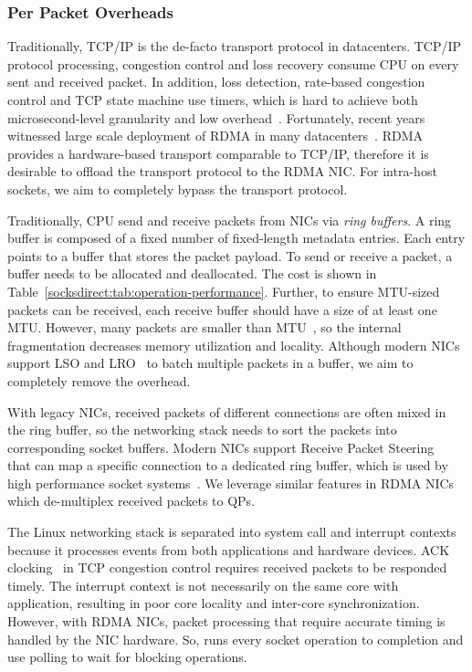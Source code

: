 \subsubsection{Per Packet Overheads}
\label{socksdirect:subsec:per-packet-overhead}
\quad

Traditionally, TCP/IP is the de-facto transport protocol in datacenters.
TCP/IP protocol processing, congestion control and loss recovery consume CPU on every sent and received packet.
In addition, loss detection, rate-based congestion control and TCP state machine use timers, which is hard to achieve both microsecond-level granularity and low overhead~\cite{jeong2014mtcp}.
Fortunately, recent years witnessed large scale deployment of RDMA in many datacenters~\cite{guo2016rdma,zhu2015congestion,mittal2015timely}.
RDMA provides a hardware-based transport comparable to TCP/IP, therefore it is desirable to offload the transport protocol to the RDMA NIC.
For intra-host sockets, we aim to completely bypass the transport protocol. %

Traditionally, CPU send and receive packets from NICs via \emph{ring buffers}.
A ring buffer is composed of a fixed number of fixed-length metadata entries.
Each entry points to a buffer that stores the packet payload.
To send or receive a packet, a buffer needs to be allocated and deallocated.
The cost is shown in Table~\ref{socksdirect:tab:operation-performance}.
Further, to ensure MTU-sized packets can be received, each receive buffer should have a size of at least one MTU.
However, many packets are smaller than MTU~\cite{thompson1997wide}, so the internal fragmentation decreases memory utilization and locality.
Although modern NICs support LSO and LRO~\cite{lsolro} to batch multiple packets in a buffer, we aim to completely remove the overhead.

With legacy NICs, received packets of different connections are often mixed in the ring buffer, so the networking stack needs to sort the packets into corresponding socket buffers.
Modern NICs support Receive Packet Steering~\cite{mellanox} that can map a specific connection to a dedicated ring buffer, which is used by high performance socket systems~\cite{jeong2014mtcp,lin2016scalable,libvma}.
We leverage similar features in RDMA NICs which de-multiplex received packets to  QPs.

The Linux networking stack is separated into system call and interrupt contexts because it processes events from both applications and hardware devices.
ACK clocking~\cite{mprdma} in TCP congestion control requires received packets to be responded timely.
The interrupt context is not necessarily on the same core with application, resulting in poor core locality and inter-core synchronization.
However, with RDMA NICs, packet processing that require accurate timing is handled by the NIC hardware.
So, \libipc{} runs every socket operation to completion and use polling to wait for blocking operations.


